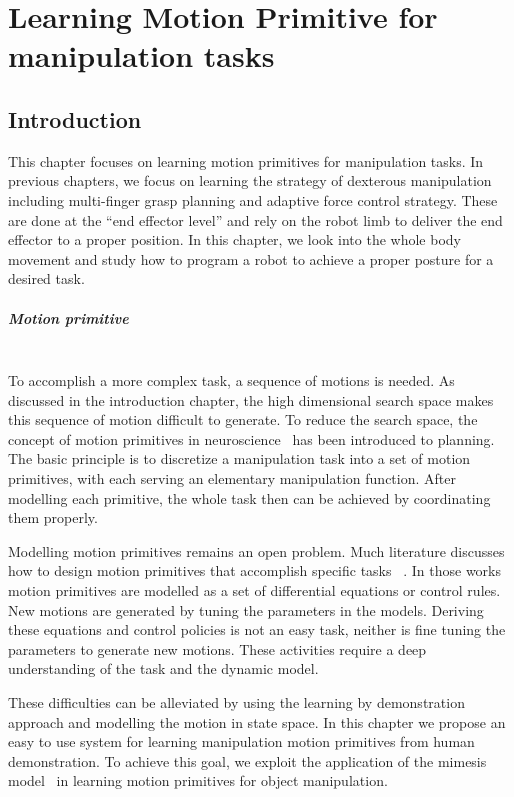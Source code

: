 \chapter{Learning Motion Primitive for manipulation tasks}
\label{cha5}

\section{Introduction}
\label{cha5:sec1}
This chapter focuses on learning motion primitives for manipulation tasks. In previous chapters, we focus on learning the strategy of dexterous manipulation including multi-finger grasp planning and adaptive force control strategy. These are done at the ``end effector level'' and rely on the robot limb to deliver the end effector to a proper position. In this chapter, we look into the whole body movement and study how to program a robot to achieve a proper posture for a desired task.

\paragraph{Motion primitive} ~\\
To accomplish a more complex task, a sequence of motions is needed. As discussed in the introduction chapter, the high dimensional search space makes this sequence of motion difficult to generate. To reduce the search space, the concept of motion primitives in neuroscience~\citep{bizzi2008combining} has been introduced to planning. The basic principle is to discretize a manipulation task into a set of motion primitives, with each serving an elementary manipulation function. After modelling each primitive, the whole task then can be achieved by coordinating them properly.

Modelling motion primitives remains an open problem. Much literature discusses how to design motion primitives that accomplish specific tasks ~\citep{michelman1994forming,felip2012manipulation,ijspeert2013dynamical}. In those works motion primitives are modelled as a set of differential equations or control rules. New motions are generated by tuning the parameters in the models. Deriving these equations and control policies is not an easy task, neither is fine tuning the parameters to generate new motions. These activities require a deep understanding of the task and the dynamic model.

These difficulties can be alleviated by using the learning by demonstration approach and modelling the motion in state space. In this chapter we propose an easy to use system for learning manipulation motion primitives from human demonstration. To achieve this goal, we exploit the application of the mimesis model~\citep{inamura2004embodied} in learning motion primitives for object manipulation.

